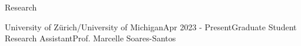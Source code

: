 \documentclass{resume} %
\begin{document}
\begin{rSection}{Research}
\begin{rSubsection}{University of Zürich/University of Michigan}{Apr 2023 - Present}{Graduate Student Research Assistant}{Prof. Marcelle Soares-Santos}
% 
% 
% 

\end{rSubsection}
\end{rSection}
\end{document}
